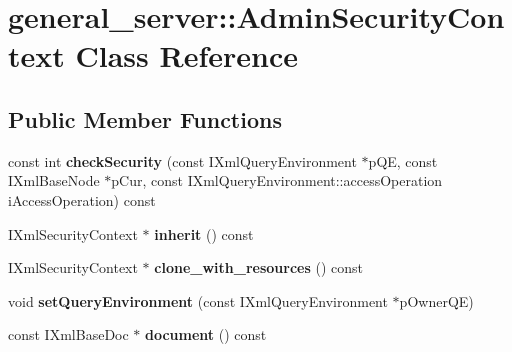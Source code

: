 \hypertarget{classgeneral__server_1_1AdminSecurityContext}{\section{general\-\_\-server\-:\-:\-Admin\-Security\-Context \-Class \-Reference}
\label{classgeneral__server_1_1AdminSecurityContext}
}
\subsection*{\-Public \-Member \-Functions}
\begin{DoxyCompactItemize}
\item 
\hypertarget{classgeneral__server_1_1AdminSecurityContext_acf9f7dbd5ad1f8a6cc2fd1e6a22064d6}{const int {\bfseries check\-Security} (const \-I\-Xml\-Query\-Environment $\ast$p\-Q\-E, const \-I\-Xml\-Base\-Node $\ast$p\-Cur, const \-I\-Xml\-Query\-Environment\-::access\-Operation i\-Access\-Operation) const }\label{classgeneral__server_1_1AdminSecurityContext_acf9f7dbd5ad1f8a6cc2fd1e6a22064d6}

\item 
\hypertarget{classgeneral__server_1_1AdminSecurityContext_add75db74cbc6cd65954676f728f04c1b}{\-I\-Xml\-Security\-Context $\ast$ {\bfseries inherit} () const }\label{classgeneral__server_1_1AdminSecurityContext_add75db74cbc6cd65954676f728f04c1b}

\item 
\hypertarget{classgeneral__server_1_1AdminSecurityContext_a1d91be3153b2b19d981cc0e3ed65dfb5}{\-I\-Xml\-Security\-Context $\ast$ {\bfseries clone\-\_\-with\-\_\-resources} () const }\label{classgeneral__server_1_1AdminSecurityContext_a1d91be3153b2b19d981cc0e3ed65dfb5}

\item 
\hypertarget{classgeneral__server_1_1AdminSecurityContext_a1bc498da42757e0111486f9d63de46ea}{void {\bfseries set\-Query\-Environment} (const \-I\-Xml\-Query\-Environment $\ast$p\-Owner\-Q\-E)}\label{classgeneral__server_1_1AdminSecurityContext_a1bc498da42757e0111486f9d63de46ea}

\item 
\hypertarget{classgeneral__server_1_1AdminSecurityContext_ac280c6b0efcf451cee73b602e214cca5}{const \-I\-Xml\-Base\-Doc $\ast$ {\bfseries document} () const }\label{classgeneral__server_1_1AdminSecurityContext_ac280c6b0efcf451cee73b602e214cca5}


\end{DoxyCompactItemize}
